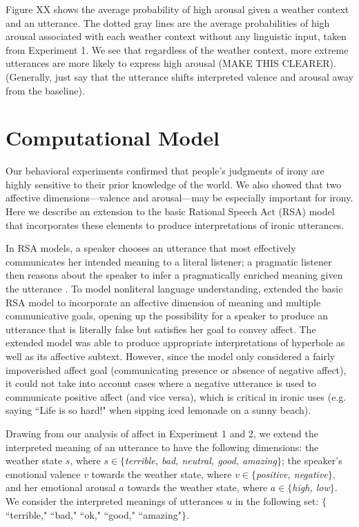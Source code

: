 \documentclass[10pt,letterpaper]{article}
\begin{document}
Figure XX shows the average probability of high arousal given a weather context and an utterance. The dotted gray lines are the average probabilities of high arousal associated with each weather context without any linguistic input, taken from Experiment 1. We see that regardless of the weather context, more extreme utterances are more likely to express high arousal (MAKE THIS CLEARER). (Generally, just say that the utterance shifts interpreted valence and arousal away from the baseline). 

\section{Computational Model}
Our behavioral experiments confirmed that people's judgments of irony are highly sensitive to their prior knowledge of the world. We also showed that two affective dimensions---valence and arousal---may be especially important for irony. Here we describe an extension to the basic Rational Speech Act (RSA) model that incorporates these elements to produce interpretations of ironic utterances. 

In RSA models, a speaker chooses an utterance that most effectively communicates her intended meaning to a literal listener; a pragmatic listener then reasons about the speaker to infer a pragmatically enriched meaning given the utterance \cite{frank2012predicting, goodman2013knowledge}. To model nonliteral language understanding, \cite{kao2014nonliteral} extended the basic RSA model to incorporate an affective dimension of meaning and multiple communicative goals, opening up the possibility for a speaker to produce an utterance that is literally false but satisfies her goal to convey affect. The extended model was able to produce appropriate interpretations of hyperbole as well as its affective subtext. However, since the model only considered a fairly impoverished affect goal (communicating presence or absence of negative affect), it could not take into account cases where a negative utterance is used to communicate positive affect (and vice versa), which is critical in ironic uses (e.g. saying ``Life is so hard!" when sipping iced lemonade on a sunny beach). 

Drawing from our analysis of affect in Experiment 1 and 2, we extend the interpreted meaning of an utterance to have the following dimensions: the weather state $s$, where $s \in \{$\emph{terrible, bad, neutral, good, amazing}$\}$; the speaker's emotional valence $v$ towards the weather state, where $v \in \{$\emph{positive, negative}$\}$, and her emotional arousal $a$ towards the weather state, where $a \in \{$\emph{high, low}$\}$. We consider the interpreted meanings of utterances $u$ in the following set: $\{$``terrible," ``bad," ``ok," ``good," ``amazing"$\}$. 
\end{document}
